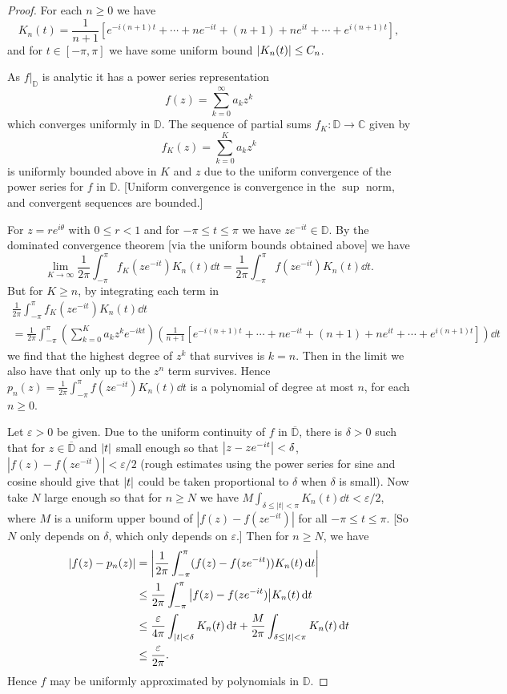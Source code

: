 \documentclass[12pt]{amsart}
\newcommand{\DD}{\mathbb{D}}
\begin{document}
\begin{proof}
\baselineskip=24pt
For each $n\geq 0$ we have \[K_n(t) = \frac{1}{n+1}\left[e^{-i(n+1)t}+ \cdots+ ne^{-it} + (n+1) + ne^{it} +\cdots + e^{i(n+1)t}\right],\] and for $t\in[-\pi,\pi]$ we have some uniform bound $\abs{K_n(t)}\leq C_n$.

As $f|_\DD$ is analytic it has a power series representation \[f(z) = \sum_{k=0}^\infty a_kz^k\] which converges uniformly in $\DD$. The sequence of partial sums $f_K\colon \mathbb{D}\to\mathbb{C}$ given by \[f_K(z) = \sum_{k=0}^Ka_kz^k\] is uniformly bounded above in $K$ and $z$ due to the uniform convergence of the power series for $f$ in $\DD$. [Uniform convergence is convergence in the $\sup$ norm, and convergent sequences are bounded.] 

For $z = re^{i\theta}$ with $0\leq r < 1$ and for $-\pi\leq t\leq \pi$ we have $ze^{-it}\in \DD$. By the dominated convergence theorem [via the uniform bounds obtained above] we have \[\lim_{K\to\infty}\frac{1}{2\pi}\int_{-\pi}^{\pi}f_K(ze^{-it})K_n(t)\dd{t} = \frac{1}{2\pi}\int_{-\pi}^{\pi}f(ze^{-it})K_n(t)\dd{t}.\] But for $K\geq n$, by integrating each term in \begin{multline*}
\frac{1}{2\pi}\int_{-\pi}^{\pi}f_K(ze^{-it})K_n(t)\dd{t} \\ = \frac{1}{2\pi}\int_{-\pi}^{\pi}\left(\sum_{k=0}^Ka_kz^ke^{-ikt}\right)\left(\frac{1}{n+1}\left[e^{-i(n+1)t}+ \cdots+ ne^{-it} + (n+1) + ne^{it} +\cdots + e^{i(n+1)t}\right]\right)\dd{t}\end{multline*}
we find that the highest degree of $z^k$ that survives is $k=n$. Then in the limit we also have that only up to the $z^n$ term survives. Hence $p_n(z) = \frac{1}{2\pi}\int_{-\pi}^{\pi}f(ze^{-it})K_n(t)\dd{t}$ is a polynomial of degree at most $n$, for each $n\geq 0$.

Let $\varepsilon>0$ be given. Due to the uniform continuity of $f$ in $\overline{\DD}$, there is $\delta>0$ such that for $z\in\overline{\DD}$ and $\abs{t}$ small enough so that $\abs{z-ze^{-it}}<\delta$, $|f(z)-f(ze^{-it})|<\varepsilon/2$ (rough estimates using the power series for sine and cosine should give that $\abs{t}$ could be taken proportional to $\delta$ when $\delta$ is small). Now take $N$ large enough so that for $n\geq N$ we have $M\int_{\delta \leq |t|<\pi} K_n(t)\dd{t}<\varepsilon/2$, where $M$ is a uniform upper bound of $|f(z)-f(ze^{-it})|$ for all $-\pi\leq t\leq \pi$. [So $N$ only depends on $\delta$, which only depends on $\varepsilon$.] Then for $n\geq N$, we have \begin{align*}
  \abs{ f(z)-p_n(z)} &= \abs{\frac{1}{2\pi}\int_{-\pi}^{\pi}(f(z)-f(ze^{-it}))K_n(t)\dd{t}}\\
  &\leq \frac{1}{2\pi}\int_{-\pi}^{\pi}\abs{f(z)-f(ze^{-it})}K_n(t)\dd{t}\\
  &\leq \frac{\varepsilon}{4\pi}\int_{|t|<\delta} K_n(t)\dd{t} + \frac{M}{2\pi}\int_{\delta \leq |t|<\pi} K_n(t)\dd{t}\\
  &\leq \frac{\varepsilon}{2\pi} .
\end{align*} Hence $f$ may be uniformly approximated by polynomials in $\DD$.
\end{proof}
\end{document}
